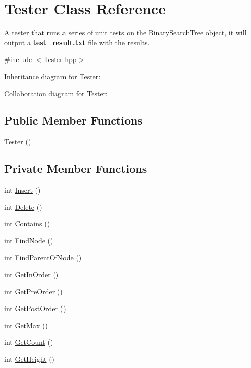 \hypertarget{classTester}{}\section{Tester Class Reference}
\label{classTester}


A tester that runs a series of unit tests on the \hyperlink{classBinarySearchTree}{Binary\+Search\+Tree} object, it will output a {\bfseries test\+\_\+result.\+txt} file with the results.  




{\ttfamily \#include $<$Tester.\+hpp$>$}



Inheritance diagram for Tester\+:


Collaboration diagram for Tester\+:
\subsection*{Public Member Functions}
\begin{DoxyCompactItemize}
\item 
\hyperlink{classTester_ad70b2b2bbf6c564e710680ec1e0ae2d6}{Tester} ()
\end{DoxyCompactItemize}
\subsection*{Private Member Functions}
\begin{DoxyCompactItemize}
\item 
int \hyperlink{classTester_a44602d13a2a8b6ddcd96c43446e9b4ab}{Insert} ()
\item 
int \hyperlink{classTester_adb23e19d3493f7aeb014189621c7aeff}{Delete} ()
\item 
int \hyperlink{classTester_a0f5017d8fc275e414ab1989adea00597}{Contains} ()
\item 
int \hyperlink{classTester_af39d595607041d8d698f086fbab0d739}{Find\+Node} ()
\item 
int \hyperlink{classTester_ab6389fb215ac9e37ed616d95f395f6c8}{Find\+Parent\+Of\+Node} ()
\item 
int \hyperlink{classTester_acac471246fa48fdd8755e2f72bdac9c2}{Get\+In\+Order} ()
\item 
int \hyperlink{classTester_a8d23502f013da34f434f9f193216f537}{Get\+Pre\+Order} ()
\item 
int \hyperlink{classTester_a8c0c74bc6be79deb64489b3426eaddfd}{Get\+Post\+Order} ()
\item 
int \hyperlink{classTester_aa89539dfb46a81d862f0fbd2a1d8e1d9}{Get\+Max} ()
\item 
int \hyperlink{classTester_a8566c7a9de770ab083943e3426f299ef}{Get\+Count} ()
\item 
int \hyperlink{classTester_aaeac31583e37e472e65983b8e7fbebbe}{Get\+Height} ()
\end{DoxyCompactItemize}


